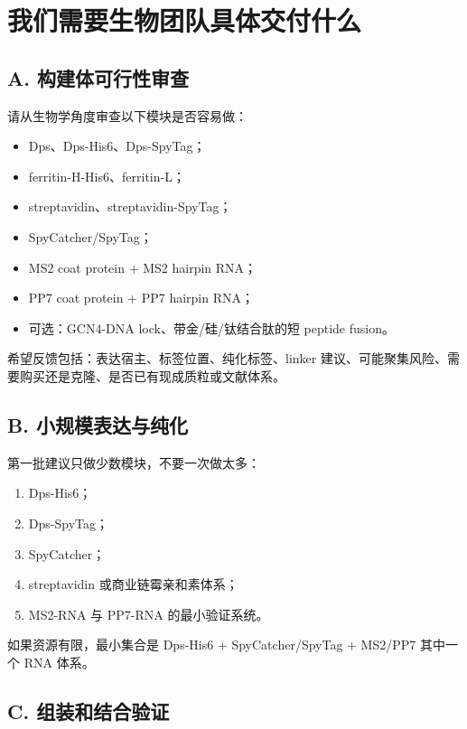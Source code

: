 \documentclass[11pt]{article}
\begin{document}
\section{我们需要生物团队具体交付什么}

\subsection{A. 构建体可行性审查}

请从生物学角度审查以下模块是否容易做：

\begin{itemize}
\item Dps、Dps-His6、Dps-SpyTag；
\item ferritin-H-His6、ferritin-L；
\item streptavidin、streptavidin-SpyTag；
\item SpyCatcher/SpyTag；
\item MS2 coat protein + MS2 hairpin RNA；
\item PP7 coat protein + PP7 hairpin RNA；
\item 可选：GCN4-DNA lock、带金/硅/钛结合肽的短 peptide fusion。
\end{itemize}

希望反馈包括：表达宿主、标签位置、纯化标签、linker 建议、可能聚集风险、需要购买还是克隆、是否已有现成质粒或文献体系。

\subsection{B. 小规模表达与纯化}

第一批建议只做少数模块，不要一次做太多：

\begin{enumerate}
\item Dps-His6；
\item Dps-SpyTag；
\item SpyCatcher；
\item streptavidin 或商业链霉亲和素体系；
\item MS2-RNA 与 PP7-RNA 的最小验证系统。
\end{enumerate}

如果资源有限，最小集合是 Dps-His6 + SpyCatcher/SpyTag + MS2/PP7 其中一个 RNA 体系。

\subsection{C. 组装和结合验证}
\end{document}

